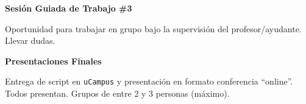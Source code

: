 \documentclass[letterpaper]{article}
\renewenvironment{itemize}{
  \begin{list}{}{
    \setlength{\leftmargin}{1.5em}
  }
}{
  \end{list}
}
\begin{document}
\begin{enumerate}[label=\roman*.]
       \begin{itemize} 
        \item[23.] {\bf Sesi\'on Guiada de Trabajo \#3}
        \begin{itemize} 
          \item[$\circ$] Oportunidad para trabajar en grupo bajo la supervisi\'on del profesor/ayudante. Llevar dudas.
        \end{itemize}
      \end{itemize}


      \begin{itemize} 
        \item[24.] {\bf Presentaciones Finales}
        \begin{itemize} 
          \item[{\color{red}\Pointinghand}] Entrega de script en \texttt{uCampus} y presentaci\'on en formato conferencia ``online''. Todos presentan. Grupos de entre 2 y 3 personas (m\'aximo).
        \end{itemize}
      \end{itemize}

\end{enumerate}


\newpage
{}
\setcounter{page}{1}
\printbibliography
\end{document}
